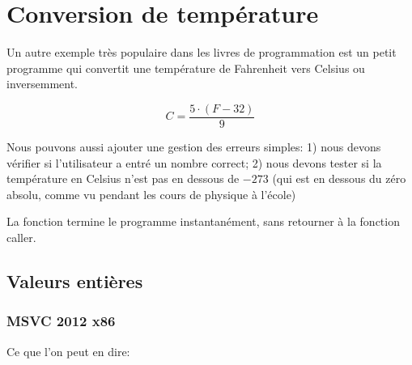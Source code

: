 \section{Conversion de température}

Un autre exemple très populaire dans
les livres de programmation est un petit programme qui convertit une température de Fahrenheit vers Celsius ou inversemment.

\[
	C=\frac{5 \cdot (F-32)}{9}
\]

Nous pouvons aussi ajouter une gestion des erreurs simples:
1) nous devons vérifier si l'utilisateur a entré un nombre correct;
2) nous devons tester si la température en Celsius n'est pas en dessous de $-273$ 
(qui est en dessous du zéro absolu, comme vu pendant les cours de physique à l'école)

La fonction  termine 
le programme instantanément, sans retourner à la fonction \gls{caller}.

\subsection{Valeurs entières}



\subsubsection{MSVC 2012 x86 \Optimizing}



Ce que l'on peut en dire:

